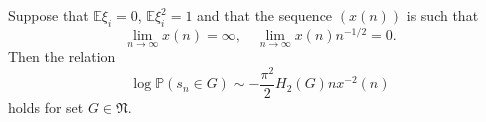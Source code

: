 \begin{theorem}
Suppose that $\mathbb E\xi_i=0$, $\mathbb E\xi_i^2=1$ and that the sequence $(x(n))$ is such that
\begin{equation*}
    \lim_{n\to\infty}x(n)=\infty,\quad
    \lim_{n\to\infty}x(n)n^{-1/2}=0.
\end{equation*}
Then the relation
\begin{equation*}
    \log\mathbb P(s_n\in G)\sim-\frac{\pi^2}{2}H_2(G)nx^{-2}(n)
\end{equation*}
holds for set $G\in\mathfrak N$.
\end{theorem}
